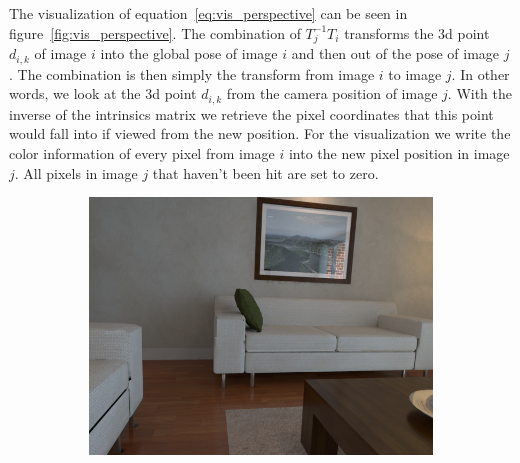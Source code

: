         The visualization of equation~\ref{eq:vis_perspective} can be seen in figure~\ref{fig:vis_perspective}.
        The combination of $T_j^{-1}T_i$ transforms the 3d point $d_{i,k}$ of image $i$ into the global pose of image $i$ and then out of the pose of image $j$.
        The combination is then simply the transform from image $i$ to image $j$.
        In other words, we look at the 3d point $d_{i,k}$ from the camera position of image $j$.
        With the inverse of the intrinsics matrix we retrieve the pixel coordinates that this point would fall into if viewed from the new position.
        For the visualization we write the color information of every pixel from image $i$ into the new pixel position in image $j$.
        All pixels in image $j$ that haven't been hit are set to zero.

        \begin{figure}[h]
            \centering
            \begin{subfigure}[b]{.3\textwidth}
                \includegraphics[scale=0.5]{images/vis_perspective_01}
            \end{subfigure}
        \end{figure}

